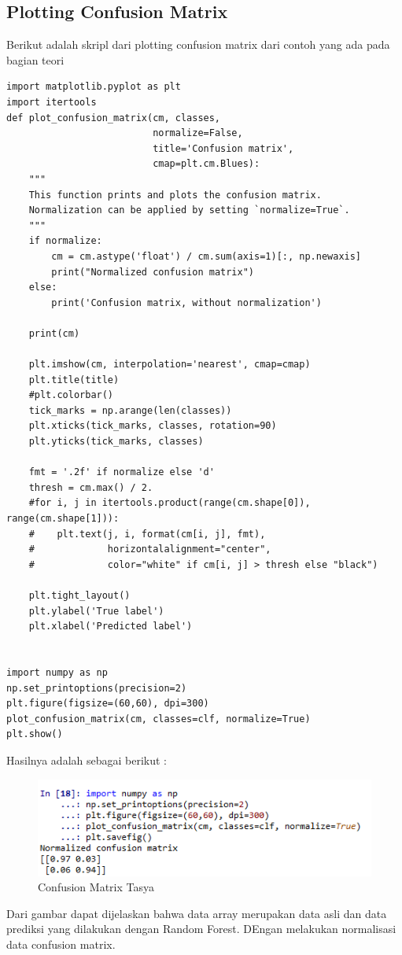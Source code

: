 \subsection{Plotting Confusion Matrix}
Berikut adalah skripl dari plotting confusion matrix dari contoh yang ada pada bagian teori
\begin{verbatim}
import matplotlib.pyplot as plt
import itertools
def plot_confusion_matrix(cm, classes,
                          normalize=False,
                          title='Confusion matrix',
                          cmap=plt.cm.Blues):
    """
    This function prints and plots the confusion matrix.
    Normalization can be applied by setting `normalize=True`.
    """
    if normalize:
        cm = cm.astype('float') / cm.sum(axis=1)[:, np.newaxis]
        print("Normalized confusion matrix")
    else:
        print('Confusion matrix, without normalization')

    print(cm)

    plt.imshow(cm, interpolation='nearest', cmap=cmap)
    plt.title(title)
    #plt.colorbar()
    tick_marks = np.arange(len(classes))
    plt.xticks(tick_marks, classes, rotation=90)
    plt.yticks(tick_marks, classes)

    fmt = '.2f' if normalize else 'd'
    thresh = cm.max() / 2.
    #for i, j in itertools.product(range(cm.shape[0]), range(cm.shape[1])):
    #    plt.text(j, i, format(cm[i, j], fmt),
    #             horizontalalignment="center",
    #             color="white" if cm[i, j] > thresh else "black")

    plt.tight_layout()
    plt.ylabel('True label')
    plt.xlabel('Predicted label')
    

import numpy as np
np.set_printoptions(precision=2)
plt.figure(figsize=(60,60), dpi=300)
plot_confusion_matrix(cm, classes=clf, normalize=True)
plt.show()
\end{verbatim}
Hasilnya adalah sebagai berikut :
\begin{figure}[ht]
\centering
\includegraphics[scale=0.5]{figures/praktektasya10.png}
\caption{Confusion Matrix Tasya}
\label{Praktek}
\end{figure}
Dari gambar dapat dijelaskan bahwa data array merupakan data asli dan data prediksi yang dilakukan dengan Random Forest. DEngan melakukan normalisasi data confusion matrix.

